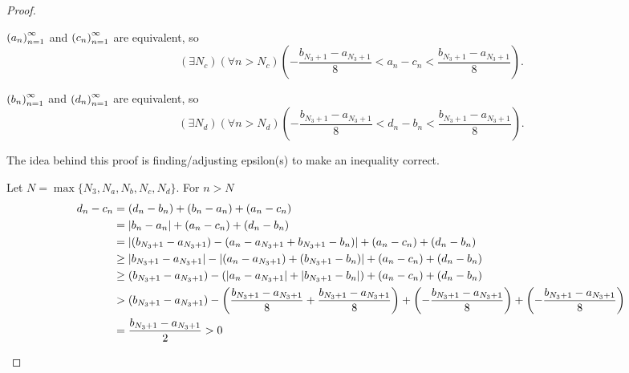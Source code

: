 \begin{proof}
\begin{enumerate}[label={(\roman*)}]
\begin{enumerate}[label={\textbf{Case \arabic*.}}]
                        ${\left({a_{n}}\right)}^{\infty}_{n=1}$ and ${\left({c_{n}}\right)}^{\infty}_{n=1}$ are equivalent, so
                        \[
                            (\exists N_{c})(\forall n > N_{c})\left(-\frac{b_{N_{3}+1} - a_{N_{3}+1}}{8} < a_{n} - c_{n} < \frac{b_{N_{3}+1} - a_{N_{3}+1}}{8}\right).
                        \]

                        ${\left({b_{n}}\right)}^{\infty}_{n=1}$ and ${\left({d_{n}}\right)}^{\infty}_{n=1}$ are equivalent, so
                        \[
                            (\exists N_{d})(\forall n > N_{d})\left(-\frac{b_{N_{3}+1} - a_{N_{3}+1}}{8} < d_{n} - b_{n} < \frac{b_{N_{3}+1} - a_{N_{3}+1}}{8}\right).
                        \]

                        The idea behind this proof is finding/adjusting epsilon\@(s) to make an inequality correct.

                        Let $N = \max\{ N_{3}, N_{a}, N_{b}, N_{c}, N_{d} \}$. For $n > N$
                        \begin{align*}
                            d_{n} - c_{n} & = (d_{n} - b_{n}) + (b_{n} - a_{n}) + (a_{n} - c_{n})                                                                                                                                                                          \\
                                          & = \left\vert{b_{n} - a_{n}}\right\vert + (a_{n} - c_{n}) + (d_{n} - b_{n})                                                                                                                                                                      \\
                                          & = \left\vert{(b_{N_{3}+1} - a_{N_{3}+1}) - (a_{n} - a_{N_{3}+1} + b_{N_{3}+1} - b_{n})}\right\vert + (a_{n} - c_{n}) + (d_{n} - b_{n})                                                                                                          \\
                                          & \ge \left\vert{b_{N_{3}+1} - a_{N_{3}+1}}\right\vert - \left\vert{(a_{n} - a_{N_{3}+1}) + (b_{N_{3}+1} - b_{n})}\right\vert + (a_{n} - c_{n}) + (d_{n} - b_{n})                                                                                                  \\
                                          & \ge (b_{N_{3}+1} - a_{N_{3}+1}) - \left(\left\vert{a_{n} - a_{N_{3}+1}}\right\vert + \left\vert{b_{N_{3}+1} - b_{n}}\right\vert\right) + (a_{n} - c_{n}) + (d_{n} - b_{n})                                                                                       \\
                                          & > (b_{N_{3}+1} - a_{N_{3}+1}) - \left(\frac{b_{N_{3}+1} - a_{N_{3}+1}}{8} + \frac{b_{N_{3}+1} - a_{N_{3}+1}}{8}\right) + \left(-\frac{b_{N_{3}+1} - a_{N_{3}+1}}{8}\right) + \left(-\frac{b_{N_{3}+1} - a_{N_{3}+1}}{8}\right) \\
                                          & = \frac{b_{N_{3}+1} - a_{N_{3}+1}}{2} > 0
                        \end{align*}


\end{enumerate}
\end{enumerate}
\end{proof}
